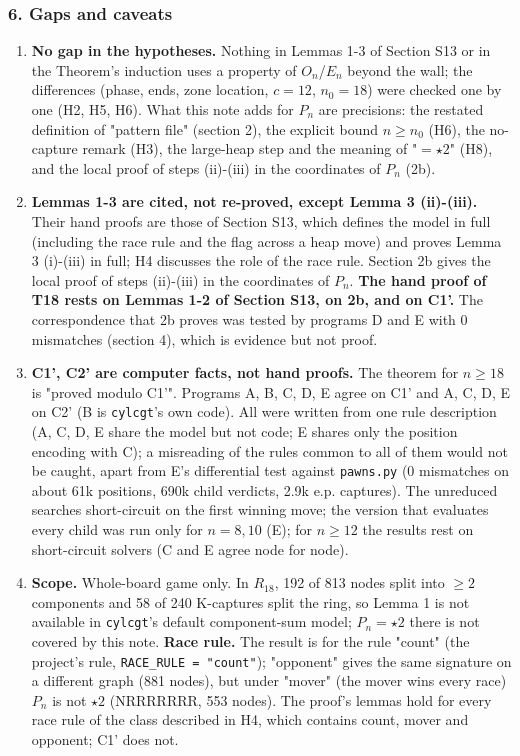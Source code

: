 \subsubsection*{6. Gaps and caveats}
\begin{enumerate}
\item \textbf{No gap in the hypotheses.} Nothing in Lemmas 1-3 of Section S13 or in the Theorem's induction uses a property of $O_n$/$E_n$ beyond the wall; the differences (phase, ends, zone location, $c=12$, $n_0=18$) were checked one by one (H2, H5, H6). What this note adds for $P_n$ are precisions: the restated definition of "pattern file" (section 2), the explicit bound $n\ge n_0$ (H6), the no-capture remark (H3), the large-heap step and the meaning of "$=\star2$" (H8), and the local proof of steps (ii)-(iii) in the coordinates of $P_n$ (2b).
\item \textbf{Lemmas 1-3 are cited, not re-proved, except Lemma 3 (ii)-(iii).} Their hand proofs are those of Section S13, which defines the model in full (including the race rule and the flag across a heap move) and proves Lemma 3 (i)-(iii) in full; H4 discusses the role of the race rule. Section 2b gives the local proof of steps (ii)-(iii) in the coordinates of $P_n$. \textbf{The hand proof of T18 rests on Lemmas 1-2 of Section S13, on 2b, and on C1'.} The correspondence that 2b proves was tested by programs D and E with 0 mismatches (section 4), which is evidence but not proof.
\item \textbf{C1', C2' are computer facts, not hand proofs.} The theorem for $n\ge18$ is "proved modulo C1'". Programs A, B, C, D, E agree on C1' and A, C, D, E on C2' (B is \texttt{cylcgt}'s own code). All were written from one rule description (A, C, D, E share the model but not code; E shares only the position encoding with C); a misreading of the rules common to all of them would not be caught, apart from E's differential test against \texttt{pawns.py} (0 mismatches on about 61k positions, 690k child verdicts, 2.9k e.p. captures). The unreduced searches short-circuit on the first winning move; the version that evaluates every child was run only for $n=8,10$ (E); for $n\ge12$ the results rest on short-circuit solvers (C and E agree node for node).
\item \textbf{Scope.} Whole-board game only. In $R_{18}$, 192 of 813 nodes split into $\ge2$ components and 58 of 240 K-captures split the ring, so Lemma 1 is not available in \texttt{cylcgt}'s default component-sum model; $P_n=\star2$ there is not covered by this note. \textbf{Race rule.} The result is for the rule "count" (the project's rule, \texttt{RACE\_RULE = "count"}); "opponent" gives the same signature on a different graph (881 nodes), but under "mover" (the mover wins every race) $P_n$ is not $\star2$ (NRRRRRRR, 553 nodes). The proof's lemmas hold for every race rule of the class described in H4, which contains count, mover and opponent; C1' does not.

\end{enumerate}
